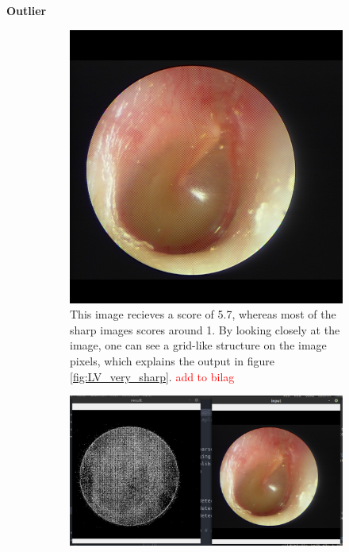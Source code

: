\textbf{Outlier}\\
\begin{figure}[H]
    \centering
    \begin{subfigure}[t]{0.6\textwidth}
        \includegraphics[width=\textwidth]{Figures/BlurredImages/lv/33.png}
        \caption{This image recieves a score of 5.7, whereas most of the sharp images scores around 1. By looking closely at the image, one can see a grid-like structure on the image pixels, which explains the output in figure \ref{fig:LV_very_sharp}. \textcolor{red}{add to bilag}}
    \end{subfigure}\hspace{1em}
    \begin{subfigure}[t]{0.6\textwidth}
        \includegraphics[width=\textwidth]{Figures/BlurredImages/lv/lv_very_sharp.png}

\end{subfigure}
\end{figure}
